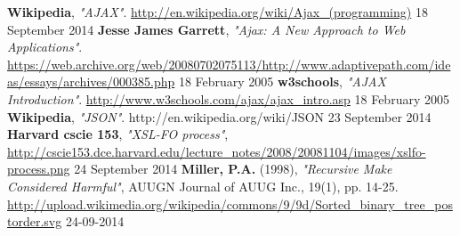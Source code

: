 \begin{thebibliography}{9}

   \textbf{Wikipedia},
   \emph{"AJAX"}.
   \url{http://en.wikipedia.org/wiki/Ajax\_(programming)}
   18 September 2014 
   \textbf{Jesse James Garrett},
   \emph{"Ajax: A New Approach to Web Applications"}.
   \url{https://web.archive.org/web/20080702075113/http://www.adaptivepath.com/ideas/essays/archives/000385.php}
   18 February 2005
   \textbf{w3schools},
   \emph{"AJAX Introduction"}.
   \url{http://www.w3schools.com/ajax/ajax\_intro.asp}
   18 February 2005
   \textbf{Wikipedia},
   \emph{"JSON"}.
   http://en.wikipedia.org/wiki/JSON
   23 September 2014
  \textbf{Harvard cscie 153},
  \emph{"XSL-FO process"},
  \url{http://cscie153.dce.harvard.edu/lecture\_notes/2008/20081104/images/xslfo-process.png}
  24 September 2014
  \textbf{Miller, P.A.} (1998), 
  \emph{"Recursive Make Considered Harmful"},
  AUUGN Journal of AUUG Inc., 19(1), pp. 14-25.
  \url{http://upload.wikimedia.org/wikipedia/commons/9/9d/Sorted_binary_tree_postorder.svg}
  24-09-2014
\end{thebibliography}